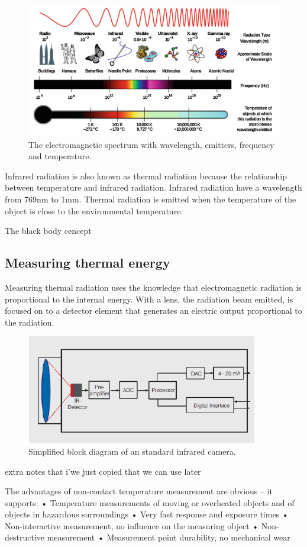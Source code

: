 \begin{figure}[H]                                         
	\includegraphics[width=.66\textwidth]{figures/em_spectrum}  
	\caption{The electromagnetic spectrum with wavelength, emitters, frequency and temperature.\cite{ignacio2017}  }
	\label{fig:em_spectrum}  
\end{figure}   
 
Infrared radiation is also known as thermal radiation because the relationship between temperature and infrared radiation. Infrared radiation have a wavelength from 769nm to 1mm. Thermal radiation is emitted when the temperature of the object is close to the environmental temperature.\cite{ignacio2017}  

The black body cencept

\subsection{Measuring thermal energy}

Measuring thermal radiation uses the knowledge that electromagnetic radiation is proportional to the internal energy. With a lens, the radiation beam emitted, is focused on to a detector element that generates an electric output proportional to the radiation.\cite{optris2009}

\begin{figure}[H]                                         
	\includegraphics[width=.55\textwidth]{figures/IR_cam}  
	\caption{Simplified block diagram of an standard infrared camera.\cite{optris2009}}
	\label{fig:em_spectrum}  
\end{figure} 

extra notes that i'we just copied that we can use later 

The advantages of non-contact temperature measurement
are obvious – it supports:
• Temperature measurements of moving or overheated
objects and of objects in hazardous surroundings
• Very fast response and exposure times
• Non-interactive measurement, no influence on
the measuring object
• Non-destructive measurement
• Measurement point durability, no mechanical wear


